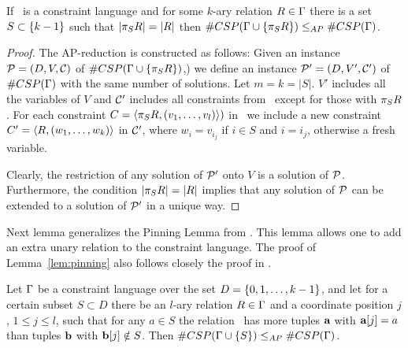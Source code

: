 \begin{lemma}\label{lem:projection}
If \mrelset\ is a constraint language and for some \(k\)-ary relation \(R\in\Gamma\)
there is a set \(S\subset \{{k-1}\}\) such that \(|\pi_{S}{R}|=|R|\) then 
\(\#CSP(\Gamma \cup \{{\pi_{S}{R}}\}) \le_{AP} \#CSP(\Gamma)\).
\end{lemma}

\begin{proof}
The AP-reduction is constructed as follows: Given an instance \(\mathcal{P}=(D,V,\mathcal{C})\)
of \(\#CSP(\Gamma\cup \{\pi_{S}{R}\})\),) we define an 
instance \(\mathcal{P}'=(D,V',\mathcal{C}')\) of \(\#CSP(\Gamma)\) with the same number of solutions.
Let \(m=k=|S|\)\@. \(V'\) includes all the variables of \(V\) and
\(\mathcal{C}'\) includes all constraints from \mconset\ except for those with \(\pi_{S}{R}\). For each
constraint \(C=\langle \pi_{S}{R},(v_1,\dotsc,v_l) \rangle)\) in \mconset\ 
we include a new constraint \(C'=\langle R,(w_1,\dotsc,w_k) \rangle\) in \(\mathcal{C}'\), where 
\(w_i=v_{i_j}\) if \(i\in S\) and \(i=i_j\), otherwise a fresh variable.

Clearly, the restriction of any solution of \(\mathcal{P}'\) onto \(V\) is a solution of \(\mathcal{P}\)\@.
Furthermore, the condition \(|\pi_{S}{R}|=|R|\) implies that any solution of \(\mathcal{P}\)
can be extended to a solution of \(\mathcal{P}'\) in a unique way.
\end{proof}


Next lemma generalizes the Pinning Lemma from
\cite{Trichotomy}. This lemma allows one to add an extra unary relation to the constraint language.
The proof of Lemma~\ref{lem:pinning} also follows closely the proof in \cite{Trichotomy}. 

\begin{lemma}\label{lem:pinning}
Let \(\Gamma\) be a constraint language over the set \(D=\{{0,1,\dotsc,k-1}\}\)\@,
and let for a certain subset \(S \subset D\) 
there be an \(l\)-ary relation \(R \in \Gamma\) and a coordinate position \(j\),
\(1 \le j \le l\), such that for any \(a\in S\) the relation \mR\ has more tuples
\(\textbf{a}\) with \(\textbf{a}[j]=a\) than tuples \(\textbf{b}\) with
\(\textbf{b}[j] \notin S\)\@. Then \(\#CSP(\Gamma \cup \{{S}\}) \le_{AP} \#CSP(\Gamma)\)\@.
\end{lemma}

